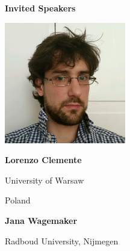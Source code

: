 \documentclass[a3paper, 12pt]{article}
\newcommand*\nfont{\fontsize{16}{19}\selectfont}
\begin{document}
\begin{minipage}[t]{.43\linewidth}
  \nfont%
  \hfill {\Large \bf Invited Speakers}

  \medskip

  \begin{minipage}{.2\linewidth}
    \includegraphics[width=\linewidth, trim=20 20 20 0, clip]{figs/lorenzo}
  \end{minipage}
  \hfill
  \begin{minipage}{.75\linewidth}
    \textbf{Lorenzo Clemente}

    University of Warsaw

    Poland
  \end{minipage}

  \medskip
  
  \begin{minipage}{.75\linewidth}
    \flushright%
    \textbf{Jana Wagemaker}

    Radboud University, Nijmegen


\end{minipage}
\end{minipage}
\end{document}
